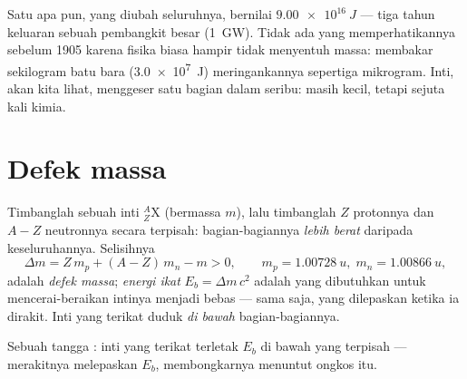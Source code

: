 \begin{example}\label{ex:g12:nuclear-energy:fortune}
Satu  apa pun, yang diubah seluruhnya, bernilai $\qty{9.00e16}{J}$ --- tiga
tahun keluaran sebuah pembangkit besar (\qty{1}{GW}). Tidak ada yang memperhatikannya sebelum
1905 karena fisika biasa hampir tidak menyentuh massa: membakar sekilogram batu bara
(\qty{3.0e7}{J}) meringankannya sepertiga mikrogram. Inti, akan kita lihat,
menggeser satu bagian dalam seribu: masih kecil, tetapi sejuta kali kimia.
\end{example}

\section{Defek massa}

\begin{definition}\label{def:g12:nuclear-energy:defect}
Timbanglah sebuah inti ${}^{A}_{Z}\mathrm{X}$ (bermassa $m$), lalu timbanglah $Z$ protonnya
dan $A - Z$ neutronnya secara terpisah: bagian-bagiannya \emph{lebih berat} daripada keseluruhannya.
Selisihnya
\[
\Delta m = Z\,m_p + (A - Z)\,m_n - m > 0,
\qquad m_p = \qty{1.00728}{u},\; m_n = \qty{1.00866}{u},
\]
adalah \emph{defek massa}; \emph{energi
ikat} $E_b = \Delta m\,c^2$ adalah  yang dibutuhkan untuk
mencerai-beraikan intinya menjadi  bebas --- sama saja,  yang dilepaskan
ketika ia dirakit. Inti yang terikat duduk \emph{di bawah} bagian-bagiannya.
\end{definition}

\begin{omfigure}

{\small Sebuah tangga : inti yang terikat terletak $E_b$ di bawah 
yang terpisah --- merakitnya melepaskan $E_b$, membongkarnya menuntut ongkos itu.}
\end{omfigure}

